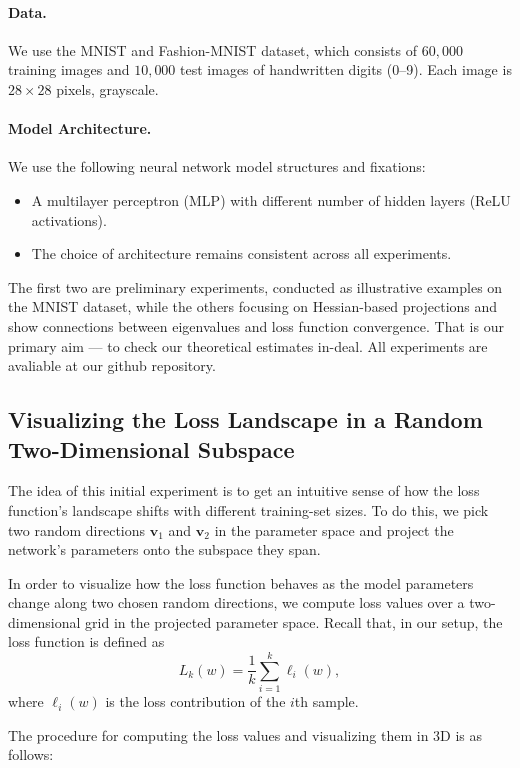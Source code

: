 \documentclass{article}
\begin{document}
\paragraph{Data.}
We use the MNIST \cite{deng2012mnist} and Fashion-MNIST \cite{xiao2017fashion} dataset, which consists of $60{,}000$
training images and $10{,}000$ test
images of handwritten digits (0--9). Each image is $28\times28$ pixels, grayscale.

\paragraph{Model Architecture.}
We use the following neural network model structures and fixations:
\begin{itemize}
  \item A multilayer perceptron (MLP) with different number of hidden layers (ReLU activations).
  \item The choice of architecture remains consistent across all experiments.
\end{itemize}


The first two are preliminary experiments, conducted as illustrative examples on the MNIST dataset,
while the others focusing on Hessian-based projections and show connections between eigenvalues and loss function convergence.
That is our primary aim --- to check our theoretical estimates in-deal. All experiments are avaliable at our github repository.

\subsection{Visualizing the Loss Landscape in a Random Two-Dimensional Subspace}
The idea of this initial experiment is to get an intuitive sense of how the loss function’s landscape shifts with
different training-set sizes. To do this, we pick two random directions $\mathbf{v}_1$ and $\mathbf{v}_2$ in the parameter
space and project the network’s parameters onto the subspace they span.

In order to visualize how the loss function behaves as the model parameters change along two chosen random directions, we compute loss
values over a two-dimensional grid in the projected parameter space. Recall that, in our setup, the loss function is defined as
$$L_k(w)=\frac{1}{k}\sum_{i=1}^{k}\ell_i(w),$$
where $\ell_i(w)$ is the loss contribution of the $i$th sample.

The procedure for computing the loss values and visualizing them in 3D is as follows:
\end{document}
